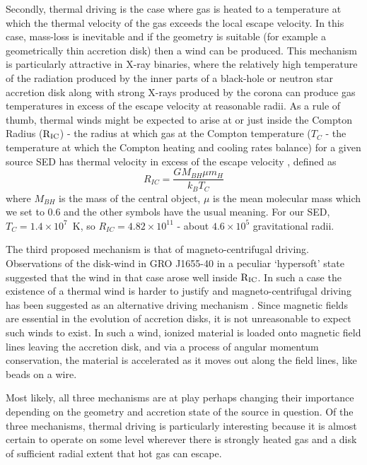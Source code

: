 \documentclass[a4paper,fleqn,usenatbib]{mnras}
\begin{document}
Secondly, thermal driving is the case where gas is heated to a temperature at which the thermal velocity of the 
gas exceeds
the local escape velocity. In this case, mass-loss is inevitable and if the geometry is suitable (for example a
geometrically thin accretion disk) then a wind can be produced. This mechanism is particularly attractive in 
X-ray binaries, where the relatively high temperature of the radiation produced by the inner parts of a black-hole or 
neutron star accretion disk along with strong X-rays produced by the corona can produce gas temperatures in excess
of the escape velocity at reasonable radii. As a rule of thumb, thermal winds might be expected
to arise at or just inside the Compton Radius ($\rm{R_{IC}}$) - the radius at which gas at the Compton temperature ($T_C$ - 
the temperature at which the Compton heating and cooling rates balance)
for a given source SED has thermal velocity in excess of the escape velocity \citep{1983ApJ...271...70B}, defined as
\begin{equation}
R_{IC}=\frac{GM_{BH}\mu m_H}{k_BT_C}
\end{equation}
where $M_{BH}$ is the mass of the central object, $\mu$ is the 
mean molecular mass which we set to 0.6 and the other symbols have the usual meaning. 
For our SED, $T_C=1.4\times10^7$~K, so $R_{IC}=4.82\times10^{11}$ - about $4.6\times10^5$ gravitational
radii.


 The third proposed mechanism is that of magneto-centrifugal driving. 
Observations of the disk-wind in GRO J1655-40 in a peculiar `hypersoft' state suggested that the wind in that
case arose well inside $\rm{R_{IC}}$. In such a case the existence of a thermal wind is harder to justify 
and magneto-centrifugal driving has been suggested as an alternative driving mechanism
\citep[but also see \citealt{2006ApJ...652L.117N,2015MNRAS.451..475U,2016ApJ...823..159S}]
{1992ApJS...80..753S,2006Natur.441..953M,2008ApJ...680.1359M,2009ApJ...701..865K}. Since
magnetic fields are essential in the evolution of accretion disks, it is not unreasonable to expect such winds to 
exist. In such a wind, ionized material is loaded onto magnetic field lines leaving the accretion disk, and via a process
of angular momentum conservation, the material is accelerated as it moves out along the field lines, like beads
on a wire.

Most likely, all three mechanisms are at play perhaps changing their importance depending on the
geometry and accretion state of the source in question. Of the three mechanisms, thermal driving is 
particularly interesting because it is almost certain to 
operate on some level wherever there is strongly heated gas and a disk of sufficient radial extent that hot gas 
can escape. 
\end{document}
